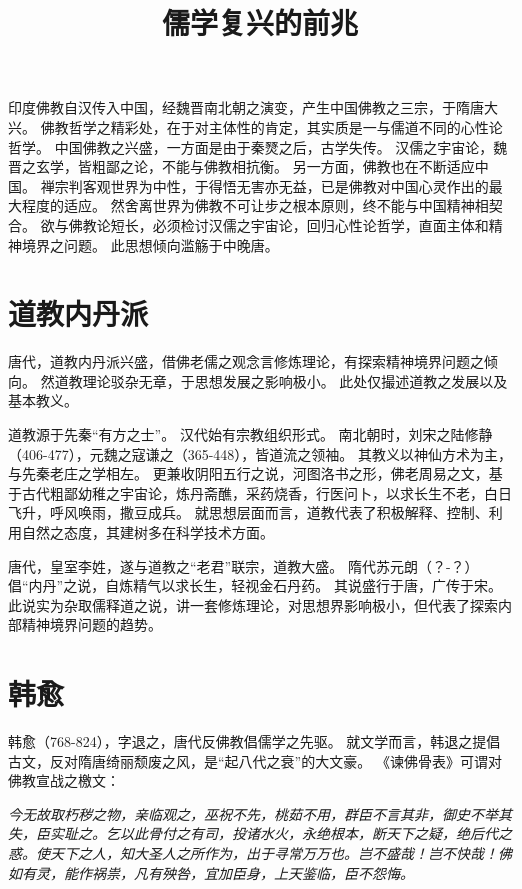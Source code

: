 \documentclass[11pt]{article}
\title{儒学复兴的前兆}
\date{}
\begin{document}
  \maketitle

  \linenumbers
印度佛教自汉传入中国，经魏晋南北朝之演变，产生中国佛教之三宗，于隋唐大兴。
佛教哲学之精彩处，在于对主体性的肯定，其实质是一与儒道不同的心性论哲学。
中国佛教之兴盛，一方面是由于秦燹之后，古学失传。
汉儒之宇宙论，魏晋之玄学，皆粗鄙之论，不能与佛教相抗衡。
另一方面，佛教也在不断适应中国。
禅宗判客观世界为中性，于得悟无害亦无益，已是佛教对中国心灵作出的最大程度的适应。
然舍离世界为佛教不可让步之根本原则，终不能与中国精神相契合。
欲与佛教论短长，必须检讨汉儒之宇宙论，回归心性论哲学，直面主体和精神境界之问题。
此思想倾向滥觞于中晚唐。

\section{道教内丹派}
唐代，道教内丹派兴盛，借佛老儒之观念言修炼理论，有探索精神境界问题之倾向。
然道教理论驳杂无章，于思想发展之影响极小。
此处仅撮述道教之发展以及基本教义。

\par

道教源于先秦“有方之士”。
汉代始有宗教组织形式。
南北朝时，刘宋之陆修静（406-477），元魏之寇谦之（365-448），皆道流之领袖。
其教义以神仙方术为主，与先秦老庄之学相左。
更兼收阴阳五行之说，河图洛书之形，佛老周易之文，基于古代粗鄙幼稚之宇宙论，炼丹斋醮，采药烧香，行医问卜，以求长生不老，白日飞升，呼风唤雨，撒豆成兵。
就思想层面而言，道教代表了积极解释、控制、利用自然之态度，其建树多在科学技术方面。

\par

唐代，皇室李姓，遂与道教之“老君”联宗，道教大盛。
隋代苏元朗（？-？）倡“内丹”之说，自炼精气以求长生，轻视金石丹药。
其说盛行于唐，广传于宋。
此说实为杂取儒释道之说，讲一套修炼理论，对思想界影响极小，但代表了探索内部精神境界问题的趋势。

\section{韩愈}
韩愈（768-824），字退之，唐代反佛教倡儒学之先驱。
就文学而言，韩退之提倡古文，反对隋唐绮丽颓废之风，是“起八代之衰”的大文豪。
《谏佛骨表》可谓对佛教宣战之檄文：

\textit{今无故取朽秽之物，亲临观之，巫祝不先，桃茹不用，群臣不言其非，御史不举其失，臣实耻之。乞以此骨付之有司，投诸水火，永绝根本，断天下之疑，绝后代之惑。使天下之人，知大圣人之所作为，出于寻常万万也。岂不盛哉！岂不快哉！佛如有灵，能作祸祟，凡有殃咎，宜加臣身，上天鉴临，臣不怨悔。}
\end{document}
